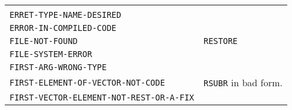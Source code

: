 \documentclass[a4paper]{scrbook}
\begin{document}
\begin{longtable}[]{@{}ll@{}}
\begin{minipage}[t]{0.36\columnwidth}
\strut
\end{minipage}\tabularnewline
\begin{minipage}[t]{0.58\columnwidth}\raggedright\strut
\texttt{ERRET-TYPE-NAME-DESIRED}\strut
\end{minipage} & \begin{minipage}[t]{0.36\columnwidth}\raggedright\strut
\strut
\end{minipage}\tabularnewline
\begin{minipage}[t]{0.58\columnwidth}\raggedright\strut
\texttt{ERROR-IN-COMPILED-CODE}\strut
\end{minipage} & \begin{minipage}[t]{0.36\columnwidth}\raggedright\strut
\strut
\end{minipage}\tabularnewline
\begin{minipage}[t]{0.58\columnwidth}\raggedright\strut
\texttt{FILE-NOT-FOUND}\strut
\end{minipage} & \begin{minipage}[t]{0.36\columnwidth}\raggedright\strut
\texttt{RESTORE}\strut
\end{minipage}\tabularnewline
\begin{minipage}[t]{0.58\columnwidth}\raggedright\strut
\texttt{FILE-SYSTEM-ERROR}\strut
\end{minipage} & \begin{minipage}[t]{0.36\columnwidth}\raggedright\strut
\strut
\end{minipage}\tabularnewline
\begin{minipage}[t]{0.58\columnwidth}\raggedright\strut
\texttt{FIRST-ARG-WRONG-TYPE}\strut
\end{minipage} & \begin{minipage}[t]{0.36\columnwidth}\raggedright\strut
\strut
\end{minipage}\tabularnewline
\begin{minipage}[t]{0.58\columnwidth}\raggedright\strut
\texttt{FIRST-ELEMENT-OF-VECTOR-NOT-CODE}\strut
\end{minipage} & \begin{minipage}[t]{0.36\columnwidth}\raggedright\strut
\texttt{RSUBR} in bad form.\strut
\end{minipage}\tabularnewline
\begin{minipage}[t]{0.58\columnwidth}\raggedright\strut
\texttt{FIRST-VECTOR-ELEMENT-NOT-REST-OR-A-FIX}\strut
\end{minipage} & \begin{minipage}[t]{0.36\columnwidth}\raggedright\strut

\end{minipage}
\end{longtable}
\end{document}

